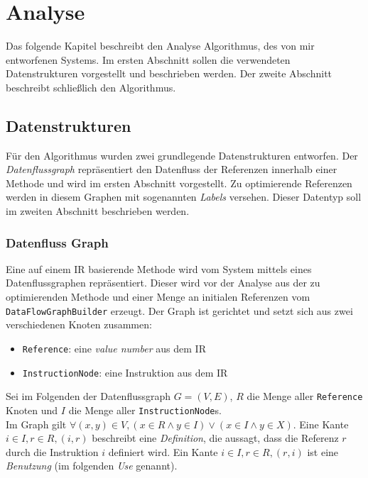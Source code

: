 \chapter{Analyse}

Das folgende Kapitel beschreibt den Analyse Algorithmus, des von mir entworfenen Systems.
Im ersten Abschnitt sollen die verwendeten Datenstrukturen vorgestellt und beschrieben werden.
Der zweite Abschnitt beschreibt schließlich den Algorithmus.

\section{Datenstrukturen}

Für den Algorithmus wurden zwei grundlegende Datenstrukturen entworfen. Der 
\textit{Datenflussgraph} repräsentiert den Datenfluss der Referenzen innerhalb 
einer Methode und wird im ersten Abschnitt vorgestellt. Zu optimierende Referenzen
werden in diesem Graphen mit sogenannten \textit{Labels} versehen. Dieser Datentyp
soll im zweiten Abschnitt beschrieben werden.

\subsection{Datenfluss Graph}\label{ssec:DFG}

Eine auf einem IR basierende Methode wird vom System mittels eines Datenflussgraphen 
repräsentiert. Dieser wird vor der Analyse aus der zu optimierenden
Methode und einer Menge an initialen Referenzen vom \texttt{DataFlowGraphBuilder}
erzeugt. Der Graph ist gerichtet und setzt sich aus zwei verschiedenen Knoten zusammen:

\begin{itemize}
	\item \texttt{Reference}: eine \textit{value number} aus dem IR
	\item \texttt{InstructionNode}: eine Instruktion aus dem IR
\end{itemize}

Sei im Folgenden der Datenflussgraph $G = (V, E)$, $R$ die Menge aller \texttt{Reference} 
Knoten und $I$ die Menge aller \texttt{InstructionNode}s. 
\\
Im Graph gilt $\forall (x, y) \in V,  (x \in R \wedge y \in I) \vee (x \in I \wedge y \in X)$.
Eine Kante $i \in I, r \in R, (i, r)$ beschreibt eine \textit{Definition}, die aussagt, 
dass die Referenz $r$ durch die Instruktion $i$ definiert wird. Ein Kante 
$i \in I, r \in R, (r, i)$ ist eine \textit{Benutzung} (im folgenden \textit{Use}
genannt). 

